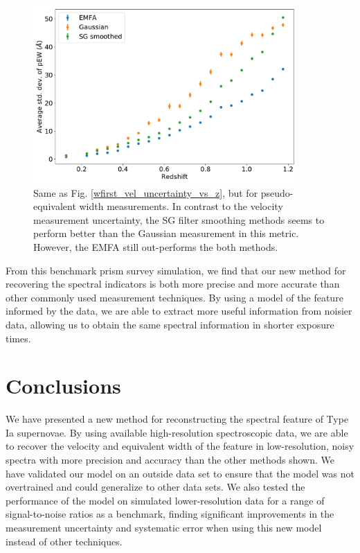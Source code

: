 \begin{figure}[!htb]
    \centering
    \includegraphics[width=0.9\textwidth]{figures/si_feat_pca/wfirst_pew_uncert.pdf}
    \caption{Same as Fig. \ref{wfirst_vel_uncertainty_vs_z}, but for pseudo-equivalent width measurements. In contrast to the velocity measurement uncertainty, the SG filter smoothing methods seems to perform better than the Gaussian measurement in this metric. However, the EMFA still out-performs the both methods.}
    \label{wfirst_ew_uncertainty_vs_z}
\end{figure}

From this benchmark prism survey simulation, we find that our new method for recovering the \siliconii\; spectral indicators is both more precise and more accurate than other commonly used measurement techniques. By using a model of the feature informed by the data, we are able to extract more useful information from noisier data, allowing us to obtain the same spectral information in shorter exposure times. 

\section{Conclusions}
\label{conclusions}
We have presented a new method for reconstructing the \siliconii\; spectral feature of Type Ia supernovae. By using available high-resolution spectroscopic data, we are able to recover the velocity and equivalent width of the feature in low-resolution, noisy spectra with more precision and accuracy than the other methods shown. We have validated our model on an outside data set to ensure that the model was not overtrained and could generalize to other data sets. We also tested the performance of the model on simulated lower-resolution data for a range of signal-to-noise ratios as a benchmark, finding significant improvements in the measurement uncertainty and systematic error when using this new model instead of other techniques.

